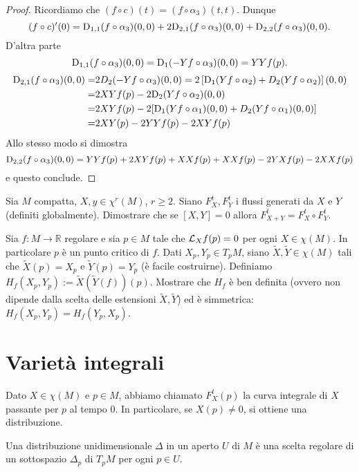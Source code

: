 \begin{proof}
Ricordiamo che $(f\circ c)(t)=(f\circ\alpha_3)(t,t)$. Dunque 
\[(f\circ c)'(0)=\mathrm D_{1,1}(f\circ\alpha_3)(0,0)+2\mathrm D_{2,1}(f\circ\alpha_3)(0,0)+\mathrm D_{2,2}(f\circ\alpha_3)(0,0).\]
D'altra parte
\[\mathrm D_{1,1}(f\circ\alpha_3)(0,0)=\mathrm D_1(-Yf\circ\alpha_3)(0,0)=YYf(p).\]
\begin{align*}
\mathrm D_{2,1}(f\circ\alpha_3)(0,0)=&2D_2(-Yf\circ\alpha_3)(0,0)=2\left[\mathrm D_1(Yf\circ\alpha_2)+D_2(Yf\circ\alpha_2)\right](0,0)
\\ =& 2XYf(p)-2\mathrm D_2(Yf\circ\alpha_2)(0,0)
\\ =& 2XYf(p)-2[\mathrm D_1(Yf\circ\alpha_1)(0,0)+D_2(Yf\circ\alpha_1)(0,0)]
\\ =& 2XY(p)-2YYf(p)-2XYf(p)
 \end{align*}
Allo stesso modo si dimostra \[\mathrm D_{2,2}(f\circ\alpha_3)(0,0)=YYf(p)+2XYf(p)+XXf(p)+XXf(p)-2YXf(p)-2XXf(p)\] e questo conclude. 
\end{proof}

\begin{exercise}
 Sia $M$ compatta, $X,y\in\chi^r(M)$, $r\geq 2$. Siano $F_X^t,F_Y^t$ i flussi generati da $X$ e $Y$ (definiti globalmente). Dimostrare che se $[X,Y]=0$ allora $F_{X+Y}^t=F_X^t\circ F_Y^t$.
\end{exercise}

\begin{exercise}
 Sia $f:M\to \mathbb{R}$ regolare e sia $p\in M$ tale che $\mathcal L_Xf(p)=0$ per ogni $X\in\chi(M)$. In particolare $p$ è un punto critico di $f$. Dati $X_p,Y_p\in T_pM$, siano $\tilde{X},\tilde{Y}\in\chi(M)$ tali che $\tilde{X}(p)=X_p$ e $\tilde{Y}(p)=Y_p$ (è facile costruirne). Definiamo $H_f(X_p,Y_p):=\tilde{X}(\tilde{Y}(f))(p)$. Mostrare che $H_f$ è ben definita (ovvero non dipende dalla scelta delle estensioni $\tilde{X},\tilde{Y}$) ed è simmetrica: $H_f(X_p,Y_p)=H_f(Y_p,X_p)$.
\end{exercise}


\section{Varietà integrali}

Dato $X\in\chi(M)$ e $p\in M$, abbiamo chiamato $F_X^t(p)$ la curva integrale di $X$ passante per $p$ al tempo $0$. In particolare, se $X(p)\neq 0$, si ottiene una distribuzione.

\begin{definition}
 Una distribuzione unidimensionale $\Delta$ in un aperto $U$ di $M$ è una scelta regolare di un sottospazio $\Delta_p$ di $T_pM$ per ogni $p\in U$.
\end{definition}

